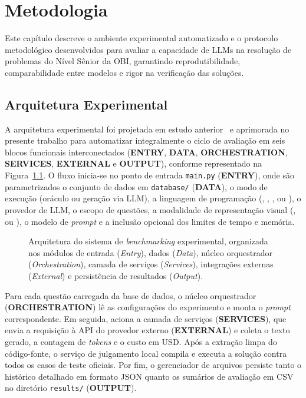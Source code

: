 \chapter{Metodologia}\label{cap:metodologia}

Este capítulo descreve o ambiente experimental automatizado e o protocolo metodológico desenvolvidos para avaliar a capacidade de LLMs na resolução de problemas do Nível Sênior da OBI, garantindo reprodutibilidade, comparabilidade entre modelos e rigor na verificação das soluções.

\section{Arquitetura Experimental}

A arquitetura experimental foi projetada em estudo anterior~\citep{angelo2026ise} e aprimorada no presente trabalho para automatizar integralmente o ciclo de avaliação em seis blocos funcionais interconectados (\textbf{ENTRY}, \textbf{DATA}, \textbf{ORCHESTRATION}, \textbf{SERVICES}, \textbf{EXTERNAL} e \textbf{OUTPUT}), conforme representado na Figura~\ref{fig:met-arquitetura}. O fluxo inicia-se no ponto de entrada \texttt{main.py} (\textbf{ENTRY}), onde são parametrizados o conjunto de dados em \texttt{database/} (\textbf{DATA}), o modo de execução (oráculo ou geração via LLM), a linguagem de programação (, , ,  ou ), o provedor de LLM, o escopo de questões, a modalidade de representação visual (,  ou ), o modelo de \textit{prompt} e a inclusão opcional dos limites de tempo e memória.

\begin{figure}[!htbp]
\centering
\resizebox{\textwidth}{!}{}
\caption[Arquitetura do sistema de benchmarking experimental]{Arquitetura do sistema de \textit{benchmarking} experimental, organizada nos módulos de entrada (\textit{Entry}), dados (\textit{Data}), núcleo orquestrador (\textit{Orchestration}), camada de serviços (\textit{Services}), integrações externas (\textit{External}) e persistência de resultados (\textit{Output}).}
\label{fig:met-arquitetura}
\end{figure}

Para cada questão carregada da base de dados, o núcleo orquestrador (\textbf{ORCHESTRATION}) lê as configurações do experimento e monta o \textit{prompt} correspondente. Em seguida, aciona a camada de serviços (\textbf{SERVICES}), que envia a requisição à API do provedor externo (\textbf{EXTERNAL}) e coleta o texto gerado, a contagem de \textit{tokens} e o custo em USD. Após a extração limpa do código-fonte, o serviço de julgamento local compila e executa a solução contra todos os casos de teste oficiais. Por fim, o gerenciador de arquivos persiste tanto o histórico detalhado em formato JSON quanto os sumários de avaliação em CSV no diretório \texttt{results/} (\textbf{OUTPUT}).

